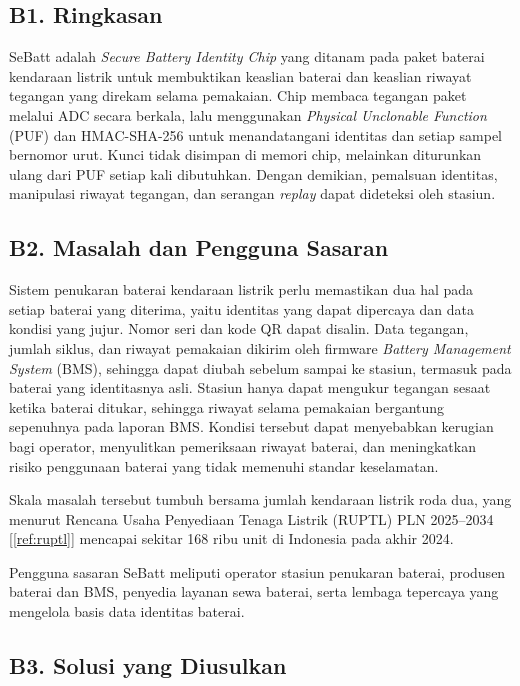 \documentclass[11pt,a4paper]{article}
\newcommand{\rujuk}[1]{[\ref{#1}]}   %
\begin{document}
\subsection{B1. Ringkasan}

SeBatt adalah \textit{Secure Battery Identity Chip} yang ditanam pada paket baterai kendaraan listrik untuk membuktikan keaslian baterai dan keaslian riwayat tegangan yang direkam selama pemakaian. Chip membaca tegangan paket melalui ADC secara berkala, lalu menggunakan \textit{Physical Unclonable Function} (PUF) dan HMAC-SHA-256 untuk menandatangani identitas dan setiap sampel bernomor urut. Kunci tidak disimpan di memori chip, melainkan diturunkan ulang dari PUF setiap kali dibutuhkan. Dengan demikian, pemalsuan identitas, manipulasi riwayat tegangan, dan serangan \textit{replay} dapat dideteksi oleh stasiun.

\subsection{B2. Masalah dan Pengguna Sasaran}

Sistem penukaran baterai kendaraan listrik perlu memastikan dua hal pada setiap baterai yang diterima, yaitu identitas yang dapat dipercaya dan data kondisi yang jujur. Nomor seri dan kode QR dapat disalin. Data tegangan, jumlah siklus, dan riwayat pemakaian dikirim oleh firmware \textit{Battery Management System} (BMS), sehingga dapat diubah sebelum sampai ke stasiun, termasuk pada baterai yang identitasnya asli. Stasiun hanya dapat mengukur tegangan sesaat ketika baterai ditukar, sehingga riwayat selama pemakaian bergantung sepenuhnya pada laporan BMS. Kondisi tersebut dapat menyebabkan kerugian bagi operator, menyulitkan pemeriksaan riwayat baterai, dan meningkatkan risiko penggunaan baterai yang tidak memenuhi standar keselamatan.

Skala masalah tersebut tumbuh bersama jumlah kendaraan listrik roda dua, yang menurut Rencana Usaha Penyediaan Tenaga Listrik (RUPTL) PLN 2025--2034 \rujuk{ref:ruptl} mencapai sekitar 168 ribu unit di Indonesia pada akhir 2024.

Pengguna sasaran SeBatt meliputi operator stasiun penukaran baterai, produsen baterai dan BMS, penyedia layanan sewa baterai, serta lembaga tepercaya yang mengelola basis data identitas baterai.

\subsection{B3. Solusi yang Diusulkan}
\end{document}
